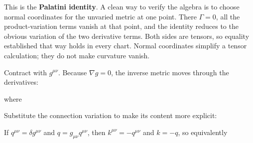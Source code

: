 \documentclass[
  11pt,
  letterpaper,
  oneside,
  openany]{scrbook}
\begin{document}
\begin{center}
\begingroup
{}
\ifdim\wd\grmathbox>\linewidth
\resizebox{\linewidth}{!}{\usebox{\grmathbox}}
\else\usebox{\grmathbox}\fi
\endgroup
\end{center}

This is the \textbf{Palatini identity}. A clean way to verify the
algebra is to choose normal coordinates for the unvaried metric at one
point. There \(\Gamma=0\), all the product-variation terms vanish at
that point, and the identity reduces to the obvious variation of the two
derivative terms. Both sides are tensors, so equality established that
way holds in every chart. Normal coordinates simplify a tensor
calculation; they do not make curvature vanish.

Contract with \(g^{\mu\nu}\). Because \(\nabla g=0\), the inverse metric
moves through the derivatives:

\begin{center}
\begingroup
{}
\ifdim\wd\grmathbox>\linewidth
\resizebox{\linewidth}{!}{\usebox{\grmathbox}}
\else\usebox{\grmathbox}\fi
\endgroup
\end{center}

where

\begin{center}
\begingroup
{}
\ifdim\wd\grmathbox>\linewidth
\resizebox{\linewidth}{!}{\usebox{\grmathbox}}
\else\usebox{\grmathbox}\fi
\endgroup
\end{center}

Substitute the connection variation to make its content more explicit:

\begin{center}
\begingroup
{}
\ifdim\wd\grmathbox>\linewidth
\resizebox{\linewidth}{!}{\usebox{\grmathbox}}
\else\usebox{\grmathbox}\fi
\endgroup
\end{center}

If \(q^{\mu\nu}=\delta g^{\mu\nu}\) and \(q=g_{\mu\nu}q^{\mu\nu}\), then
\(k^{\mu\nu}=-q^{\mu\nu}\) and \(k=-q\), so equivalently
\end{document}
